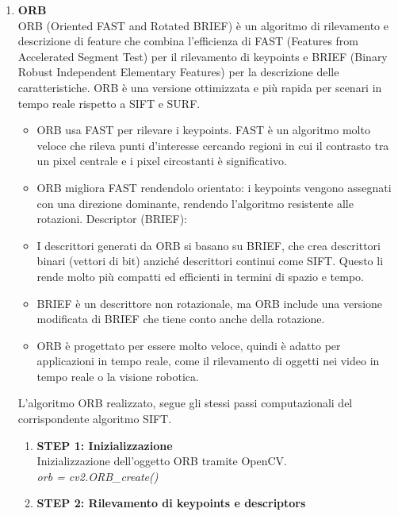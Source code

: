 \documentclass[12pt,a4paper,openright,twoside]{book}
\begin{document}
\begin{enumerate}
\begin{enumerate}
\end{enumerate}
\item \textbf{ORB}\\
ORB (Oriented FAST and Rotated BRIEF) è un algoritmo di rilevamento e descrizione di feature che combina l'efficienza di FAST (Features from Accelerated Segment Test) per il rilevamento di keypoints e BRIEF (Binary Robust Independent Elementary Features) per la descrizione delle caratteristiche. ORB è una versione ottimizzata e più rapida per scenari in tempo reale rispetto a SIFT e SURF.
\begin{itemize}
\item ORB usa FAST per rilevare i keypoints. FAST è un algoritmo molto veloce che rileva punti d'interesse cercando regioni in cui il contrasto tra un pixel centrale e i pixel circostanti è significativo.
\item ORB migliora FAST rendendolo orientato: i keypoints vengono assegnati con una direzione dominante, rendendo l'algoritmo resistente alle rotazioni.
Descriptor (BRIEF):
\item I descrittori generati da ORB si basano su BRIEF, che crea descrittori binari (vettori di bit) anziché descrittori continui come SIFT. Questo li rende molto più compatti ed efficienti in termini di spazio e tempo.
\item BRIEF è un descrittore non rotazionale, ma ORB include una versione modificata di BRIEF che tiene conto anche della rotazione.
\item ORB è progettato per essere molto veloce, quindi è adatto per applicazioni in tempo reale, come il rilevamento di oggetti nei video in tempo reale o la visione robotica.
\end{itemize}
L'algoritmo ORB realizzato, segue gli stessi passi computazionali del corrispondente algoritmo SIFT.\\
\begin{enumerate}
\item \textbf{STEP 1: Inizializzazione}\\
Inizializzazione dell'oggetto ORB tramite OpenCV. \\

{\itshape orb = cv2.ORB\_create()}\\

\item \textbf{STEP 2: Rilevamento di keypoints e descriptors}

\begin{figure}[H]
    \centering
    
\end{figure}


\end{enumerate}
\end{enumerate}
\end{document}

